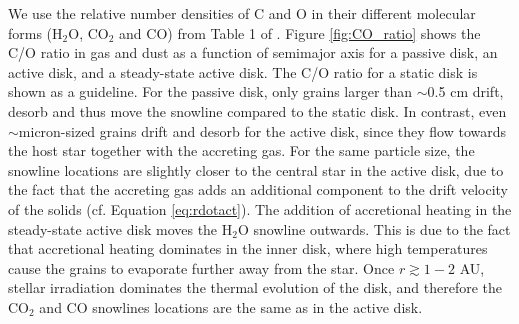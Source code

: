 \documentclass[apj]{emulateapj}
\begin{document}




We use the relative number densities of C and O in their different molecular forms (H$_2$O, CO$_2$ and CO) from Table 1 of \citet{oberg11}. Figure \ref{fig:CO_ratio} shows the C/O ratio in gas and dust as a function of semimajor axis for a passive disk, an active disk, and a steady-state active disk. The C/O ratio for a static disk is shown as a guideline. %
For the passive disk, only grains larger than $\sim$0.5 cm drift, desorb and thus move the snowline compared to the static disk. In contrast, even $\sim$micron-sized grains drift and desorb for the active disk, since they flow towards the host star together with the accreting gas. For the same particle size, the snowline locations are slightly closer to the central star in the active disk, due to the fact that the accreting gas adds an additional component to the drift velocity of the solids (cf. Equation \ref{eq:rdotact}). The addition of accretional heating in the steady-state active disk moves the H$_2$O snowline outwards. This is due to the fact that accretional heating dominates in the inner disk, where high temperatures cause the grains to evaporate further away from the star. Once $r\gtrsim1-2$  AU, stellar irradiation dominates the thermal evolution of the disk, and therefore the CO$_2$ and CO snowlines locations are the same as in the active disk. 
\end{document}
